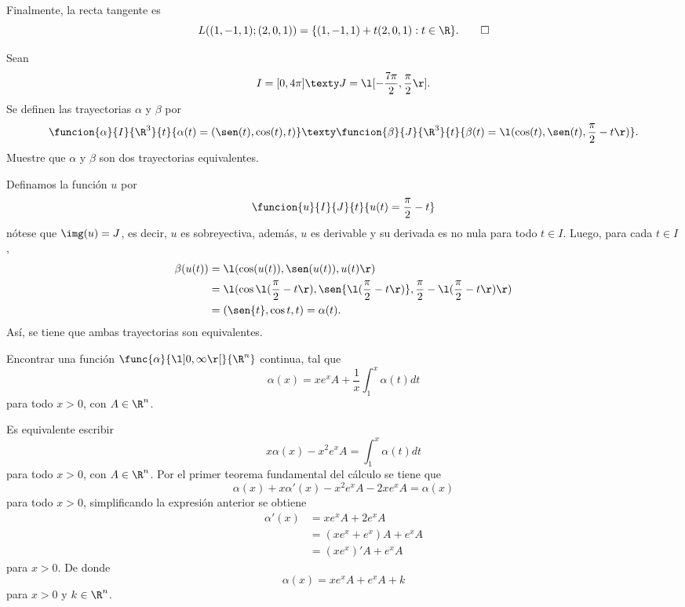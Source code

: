 \documentclass[a4,11pt]{aleph-examen}
\begin{document}
\begin{preguntas}
\begin{respuesta}
    Finalmente, la recta tangente es
    \[
        L((1,-1,1);(2,0,1))=\{(1,-1,1)+t(2,0,1):t\in\R\}.\qedhere
    \]
\end{respuesta}

\item
	Sean
	\[
	    I = [0, 4\pi]
	    \texty
	    J = \l[-\frac{7\pi}{2}, \frac{\pi}{2}\r].
	\]
	Se definen las trayectorias $\alpha$ y $\beta$ por
    \[
        \funcion{\alpha}{I}{\R^3}
        {t}{\alpha(t)=(\sen(t), \cos(t), t)}
	\texty
        \funcion{\beta}{J}{\R^3}
        {t}{\beta(t) = \l(\cos(t), \sen(t), \frac{\pi}{2} - t\r)}.
	\]
    Muestre que $\alpha$ y $\beta$ son dos trayectorias equivalentes.
    
\begin{respuesta}
    Definamos la función $u$ por
    \[
        \funcion{u}{I}{J}{t}{u(t) = \frac{\pi}{2} - t}
	\]
    nótese que $\img(u)=J$, es decir, $u$ es sobreyectiva, además, $u$ es derivable y su derivada es no nula para todo $t\in I$. Luego, para cada $t\in I$,
    \begin{align*}
        \beta(u(t)) 
            & = \l(\cos(u(t)), \sen(u(t)), u(t)\r)\\
            & =\l(\cos{\l(\frac{\pi}{2} - t\r)}, \sen{\l(\frac{\pi}{2} - t\r)}, \frac{\pi}{2} - \l(\frac{\pi}{2} - t\r)\r)\\
            & = (\sen{t}, \cos{t}, t) = \alpha(t).
    \end{align*}
    Así, se tiene que ambas trayectorias son equivalentes.
\end{respuesta}

\item 
    Encontrar una función $\func{\alpha}{\l]0,\infty\r[}{\R^n}$ continua, tal que
    \[
        \alpha(x)=xe^xA+\dfrac{1}{x}\int_1^x \alpha(t)dt
    \]
    para todo $x>0$, con $A\in\R^n$.

\begin{respuesta}
    Es equivalente escribir
    \begin{equation}
        \label{eq1}
        x\alpha(x)-x^2e^xA=\int_1^x \alpha(t)dt
    \end{equation}
    para todo $x>0$, con $A\in\R^n$.
    Por el primer teorema fundamental del cálculo se tiene que
    \[
        \alpha(x)+x\alpha'(x)-x^2e^xA-2xe^xA=\alpha(x)
    \]
    para todo $x>0$, simplificando la expresión anterior se obtiene
    \begin{align*}
        \alpha'(x)&=xe^xA+2e^xA\\
        &=(xe^x+e^x)A+e^xA\\
        &=(xe^x)'A+e^xA
    \end{align*}
    para $x>0$. De donde
    \[
        \alpha(x)=xe^xA+e^xA+k
    \]
    para $x>0$ y $k\in\R^n$.
    

\end{respuesta}
\end{preguntas}
\end{document}
